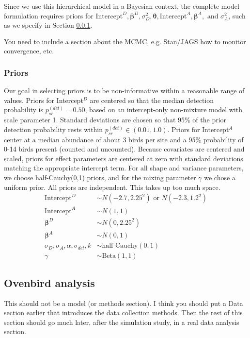 \documentclass[useAMS,usenatbib,referee,12pt]{article}
\newcommand{\jarad}[1]{{\color{red} #1}}
\begin{document}
Since we use this hierarchical model in a Bayesian context, the complete model formulation requires priors for $\text{Intercept}^D, \boldsymbol{\beta}^D, \sigma_{D}^2, \boldsymbol{\theta}, \text{Intercept}^A, \boldsymbol{\beta}^A, \text{ and } \sigma_{A}^2$, such as we specify in Section \ref{sec:priors}.

\jarad{You need to include a section about the MCMC, e.g. Stan/JAGS how to monitor convergence, etc.}

\subsubsection{Priors}\label{sec:priors}
Our goal in selecting priors is to be non-informative within a reasonable range of values.  Priors for Intercept$^D$ are centered so that the median detection probability is $p_{sr}^{(det)} = 0.50$, based on an intercept-only non-mixture model with scale parameter 1.  Standard deviations are chosen so that 95\% of the prior detection probability rests within $p_{sr}^{(det)} \in (0.01, 1.0)$.  Priors for Intercept$^A$ center at a median abundance of about 3 birds per site and a 95\% probability of 0-14 birds present (counted and uncounted).  Because covariates are centered and scaled, priors for effect parameters are centered at zero with standard deviations matching the appropriate intercept term.  For all shape and variance parameters, we choose half-Cauchy(0,1) priors, and for the mixing parameter $\gamma$ we chose a uniform prior.  All priors are independent.
\jarad{This takes up too much space.}
\begin{align*}
\text{Intercept}^D &\sim N(-2.7, 2.25^2) \text{ or } N(-2.3, 1.2^2)\\
\text{Intercept}^A &\sim N(1, 1)\\
\boldsymbol{\beta}^D &\sim N(0, 2.25^2)\\
\boldsymbol{\beta}^A &\sim N(0, 1)\\
\sigma_D, \sigma_A, \alpha, \sigma_{det}, k &\sim \text{half-Cauchy}(0,1)\\
\gamma &\sim \text{Beta}(1,1)
\end{align*}

\subsection{Ovenbird analysis}\label{sec:ovenbirdanalysis}

\jarad{This should not be a model (or methods section). I think you should put a Data section earlier that introduces the data collection methods. Then the rest of this section should go much later, after the simulation study, in a real data analysis section. } 
\end{document}
